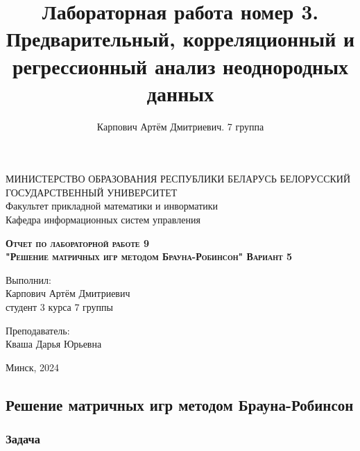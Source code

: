 \documentclass[11pt]{article}
\title{Лабораторная работа номер 3. \\ Предварительный, корреляционный и регрессионный анализ неоднородных данных }
\author{Карпович Артём Дмитриевич. 7 группа}
\begin{document}
    \begin{titlepage}
    \newpage
    
    \begin{center}
    МИНИСТЕРСТВО ОБРАЗОВАНИЯ РЕСПУБЛИКИ БЕЛАРУСЬ БЕЛОРУССКИЙ ГОСУДАРСТВЕННЫЙ УНИВЕРСИТЕТ \\
    Факультет прикладной математики и инворматики \\ Кафедра информационных систем управления 
    \end{center}
    
    \vspace{8em}
    
    \vspace{2em}
    
    \begin{center}
    \textsc{\textbf{Отчет по лабораторной работе 9 \\
    "Решение матричных игр методом Брауна-Робинсон"
    \linebreak Вариант 5}}
    \end{center}
    
    \vspace{6em}
    
    \begin{flushright}
        Выполнил:\\
        Карпович Артём Дмитриевич\\
        студент 3 курса 7 группы
    \end{flushright}

    \begin{flushright}
        Преподаватель:\\
        Кваша Дарья Юрьевна
    \end{flushright}
    \vspace{\fill}
    
    \begin{center}
    Минск, 2024
    \end{center}
    
    \end{titlepage}
    
    

    
    \begin{center}
        \subsection*{Решение матричных игр методом Брауна-Робинсон}
\end{center}
\subsubsection*{Задача}
\end{document}
